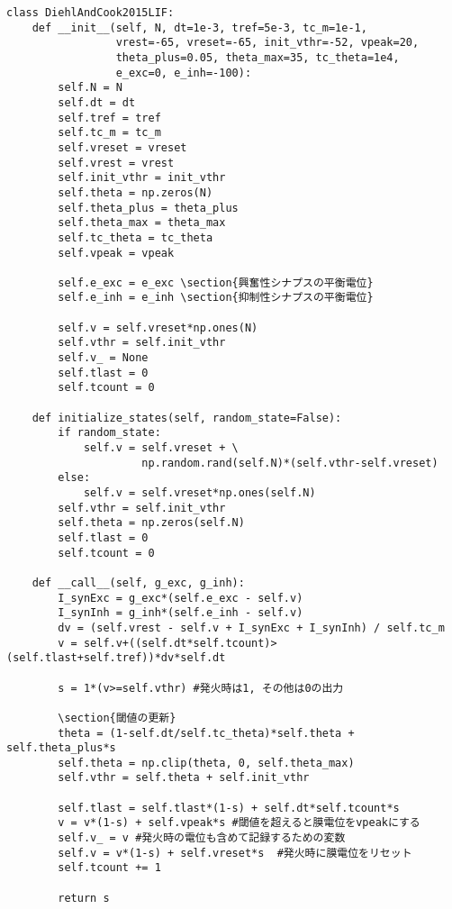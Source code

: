 \begin{verbatim}
class DiehlAndCook2015LIF:
    def __init__(self, N, dt=1e-3, tref=5e-3, tc_m=1e-1,
                 vrest=-65, vreset=-65, init_vthr=-52, vpeak=20,
                 theta_plus=0.05, theta_max=35, tc_theta=1e4,
                 e_exc=0, e_inh=-100):
        self.N = N
        self.dt = dt
        self.tref = tref
        self.tc_m = tc_m 
        self.vreset = vreset
        self.vrest = vrest
        self.init_vthr = init_vthr
        self.theta = np.zeros(N)
        self.theta_plus = theta_plus
        self.theta_max = theta_max
        self.tc_theta = tc_theta
        self.vpeak = vpeak

        self.e_exc = e_exc \section{興奮性シナプスの平衡電位}
        self.e_inh = e_inh \section{抑制性シナプスの平衡電位}
        
        self.v = self.vreset*np.ones(N)
        self.vthr = self.init_vthr
        self.v_ = None
        self.tlast = 0
        self.tcount = 0
    
    def initialize_states(self, random_state=False):
        if random_state:
            self.v = self.vreset + \ 
                     np.random.rand(self.N)*(self.vthr-self.vreset) 
        else:
            self.v = self.vreset*np.ones(self.N)
        self.vthr = self.init_vthr
        self.theta = np.zeros(self.N)
        self.tlast = 0
        self.tcount = 0
        
    def __call__(self, g_exc, g_inh):
        I_synExc = g_exc*(self.e_exc - self.v) 
        I_synInh = g_inh*(self.e_inh - self.v)
        dv = (self.vrest - self.v + I_synExc + I_synInh) / self.tc_m
        v = self.v+((self.dt*self.tcount)>(self.tlast+self.tref))*dv*self.dt
        
        s = 1*(v>=self.vthr) #発火時は1, その他は0の出力
        
        \section{閾値の更新}
        theta = (1-self.dt/self.tc_theta)*self.theta + self.theta_plus*s
        self.theta = np.clip(theta, 0, self.theta_max)
        self.vthr = self.theta + self.init_vthr
        
        self.tlast = self.tlast*(1-s) + self.dt*self.tcount*s
        v = v*(1-s) + self.vpeak*s #閾値を超えると膜電位をvpeakにする
        self.v_ = v #発火時の電位も含めて記録するための変数
        self.v = v*(1-s) + self.vreset*s  #発火時に膜電位をリセット
        self.tcount += 1
        
        return s 
\end{verbatim}
